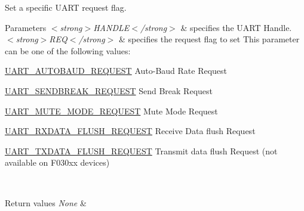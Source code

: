 Set a specific U\+A\+RT request flag. 


\begin{DoxyParams}{Parameters}
{\em $<$strong$>$\+H\+A\+N\+D\+L\+E$<$/strong$>$} & specifies the U\+A\+RT Handle. \\
\hline
{\em $<$strong$>$\+R\+E\+Q$<$/strong$>$} & specifies the request flag to set This parameter can be one of the following values\+: \begin{DoxyItemize}
\item \hyperlink{group___u_a_r_t___request___parameters_ga8cdce81a934ab7d0c2eecb4d85300d4e}{U\+A\+R\+T\+\_\+\+A\+U\+T\+O\+B\+A\+U\+D\+\_\+\+R\+E\+Q\+U\+E\+ST} Auto-\/\+Baud Rate Request \item \hyperlink{group___u_a_r_t___request___parameters_ga52ced88a9f4ce90f3725901cf91f38b3}{U\+A\+R\+T\+\_\+\+S\+E\+N\+D\+B\+R\+E\+A\+K\+\_\+\+R\+E\+Q\+U\+E\+ST} Send Break Request \item \hyperlink{group___u_a_r_t___request___parameters_gadd5f511803928fd042f7fc6ef99f9cfb}{U\+A\+R\+T\+\_\+\+M\+U\+T\+E\+\_\+\+M\+O\+D\+E\+\_\+\+R\+E\+Q\+U\+E\+ST} Mute Mode Request \item \hyperlink{group___u_a_r_t___request___parameters_gaf2ee2d4b1bdcbc7772ddc0da89566936}{U\+A\+R\+T\+\_\+\+R\+X\+D\+A\+T\+A\+\_\+\+F\+L\+U\+S\+H\+\_\+\+R\+E\+Q\+U\+E\+ST} Receive Data flush Request \item \hyperlink{group___u_a_r_t___request___parameters_gafecbd800f456ed666a42ac0842cd2c4b}{U\+A\+R\+T\+\_\+\+T\+X\+D\+A\+T\+A\+\_\+\+F\+L\+U\+S\+H\+\_\+\+R\+E\+Q\+U\+E\+ST} Transmit data flush Request (not available on F030xx devices) \end{DoxyItemize}
\\
\hline
\end{DoxyParams}

\begin{DoxyRetVals}{Return values}
{\em None} & \\
\hline
\end{DoxyRetVals}
